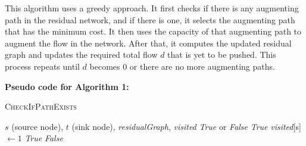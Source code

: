 \documentclass{article}
\begin{document}
This algorithm uses a greedy approach. It first checks if there is any augmenting path in the residual network, and if there is one, it selects the augmenting path that has the minimum cost. It then uses the capacity of that augmenting path to augment the flow in the network. After that, it computes the updated residual graph and updates the required total flow \(d\) that is yet to be pushed. This process repeats until \(d\) becomes 0 or there are no more augmenting paths.

\textbf{Pseudo code for Algorithm 1:}

\begin{algorithm}[H]
\caption{\textcolor{keywordcolor}{\textsc{CheckIfPathExists}}}
\begin{algorithmic}[1]
\State {} $s$ (source node), $t$ (sink node), \textit{residualGraph}, \textit{visited}
\State {} \textit{True} or \textit{False}
    \State \Return \textit{True}
\EndIf
\State \textit{visited}[s] $\gets 1$
            \State \Return \textit{True}
        \EndIf
    \EndIf
\EndFor
\State \Return \textit{False}
\end{algorithmic}
\end{algorithm}
\end{document}
